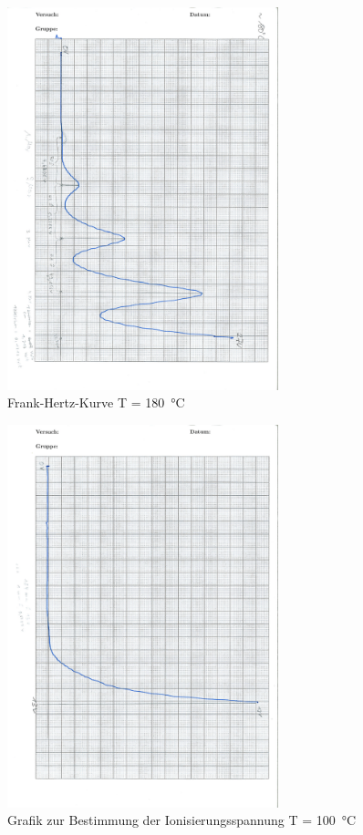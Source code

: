 \documentclass[a4,10pt]{article}
\newcommand{\V}{V601}
\begin{document}
\begin{figure}[h!]
	\centering
	\includegraphics[angle=90,origin=c, width=0.7\textwidth]{scan/Messung3.pdf}
	\caption{Frank-Hertz-Kurve T = \SI{180}{\celsius}}
	\label{fig:messung3}
\end{figure}
\begin{figure}[h!]
	\centering
	\includegraphics[angle=90,origin=c, width=0.7\textwidth]{scan/Messung4.pdf}
	\caption{Grafik zur Bestimmung der Ionisierungsspannung T = \SI{100}{\celsius}}
	\label{fig:messung4}
\end{figure}

\clearpage
\listoftodos
\listoffigures
\listoftables
\clearpage
\nocite{\V}
\printbibliography[title = Literaturverzeichnis]
\end{document}
